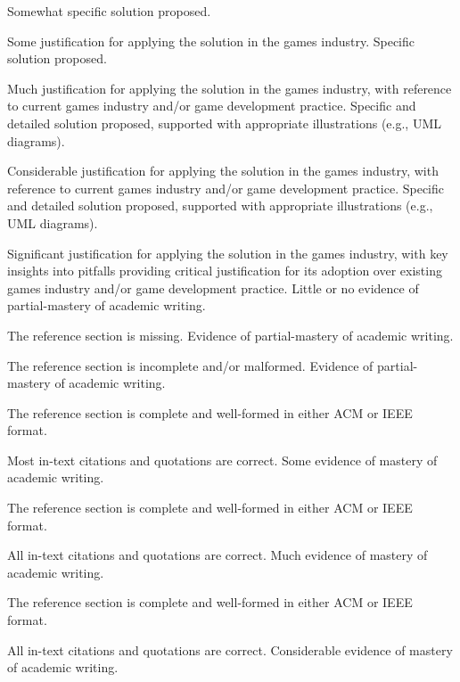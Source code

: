 \documentclass{../../../fal_assignment}
\begin{document}
\begin{markingrubric}
        \grade 		Somewhat specific solution proposed. 
        \par                 Some justification for applying the solution in the games industry. 
        \grade 		Specific solution proposed.
         \par                Much justification for applying the solution in the games industry, with reference to current games industry and/or game development practice. 
         \grade 	          Specific and detailed solution proposed, supported with appropriate illustrations (e.g., UML diagrams).
         \par                Considerable justification for applying the solution in the games industry, with reference to current games industry and/or game development practice.         
         \grade 	          Specific and detailed solution proposed, supported with appropriate illustrations (e.g., UML diagrams).
         \par                Significant justification for applying the solution in the games industry, with key insights into pitfalls providing critical justification for its adoption over existing games industry and/or game development practice.
%
        \grade\fail 	Little or no evidence of partial-mastery of academic writing.
        \par 		The reference section is missing.
        \grade 		Evidence of partial-mastery of academic writing.
        \par 		The reference section is incomplete and/or malformed.
        \grade 		Evidence of partial-mastery of academic writing.
        \par 		The reference section is complete and well-formed in either ACM or IEEE format.
        \par 		Most in-text citations and quotations are correct.
        \grade 		Some evidence of mastery of academic writing.
        \par 		The reference section is complete and well-formed in either ACM or IEEE format.
        \par 		All in-text citations and quotations are correct.
        \grade 		Much evidence of mastery of academic writing.
        \par 		The reference section is complete and well-formed in either ACM or IEEE format.
        \par 		All in-text citations and quotations are correct.
        \grade 		Considerable evidence of mastery of academic writing.

\end{markingrubric}
\end{document}
